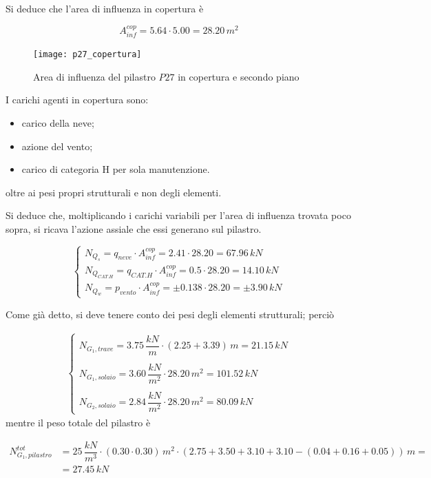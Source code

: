 Si deduce che l'area di influenza in copertura è

\[
	A_{inf}^{cop} = 5.64\cdot 5.00 = 28.20\,m^2
\]

\begin{figure}
	\centering
	\texttt{[image: p27\_copertura]}
	\caption{Area di influenza del pilastro $P27$ in copertura e secondo piano}
	\label{fig:infAreaCopertura}
\end{figure}

I carichi agenti in copertura sono:
\begin{itemize}
	\item carico della neve;
	\item azione del vento;
	\item carico di categoria H per sola manutenzione.
\end{itemize}
oltre ai pesi propri strutturali e non degli elementi.

Si deduce che, moltiplicando i carichi variabili per l'area di influenza trovata poco sopra, si ricava l'azione assiale che essi generano sul pilastro.

\[
	\begin{cases}
		N_{Q_s} = q_{neve} \cdot A_{inf}^{cop} = 2.41\cdot 28.20 = 67.96\,kN\\
		N_{Q_{CAT.H}} = q_{CAT.H} \cdot A_{inf}^{cop} = 0.5\cdot 28.20 = 14.10\,kN\\
		N_{Q_w} = p_{vento}\cdot A_{inf}^{cop} = \pm 0.138\cdot 28.20 = \pm 3.90\,kN
	\end{cases}
\]

Come già detto, si deve tenere conto dei pesi degli elementi strutturali; perciò

\begin{align*}
	\begin{cases}
		N_{G_1, trave} = 3.75\,\dfrac{kN}{m}\cdot(2.25 + 3.39)\,m = 21.15\,kN\\\\
		N_{G_1, solaio} = 3.60\,\dfrac{kN}{m^2}\cdot28.20\,m^2 = 101.52\,kN\\\\
		N_{G_2, solaio} = 2.84\,\dfrac{kN}{m^2}\cdot28.20\,m^2 = 80.09\,kN
	\end{cases}
\end{align*}
mentre il peso totale del pilastro è 

\begin{align*}
	N_{G_1, pilastro}^{tot} &= 25\,\dfrac{kN}{m^3}\cdot(0.30\cdot 0.30)\,m^2\cdot(2.75 +3.50+3.10+3.10-(0.04+0.16+0.05))\,m =\\&= 27.45\,kN
\end{align*}


